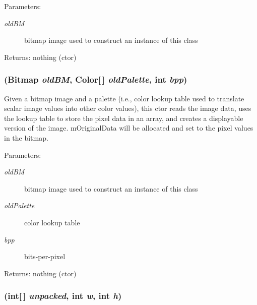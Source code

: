 \begin{Desc}
\item[Parameters:]
\begin{description}
\item[{\em old\-BM}]bitmap image used to construct an instance of this class \end{description}
\end{Desc}
\begin{Desc}
\item[Returns:]nothing (ctor) \end{Desc}
\subsubsection{ (Bitmap {\em old\-BM}, Color[$\,$] {\em old\-Palette}, int {\em bpp})}\label{class_c_s_image_viewer_1_1_color_image_data_0221e86bc6947ba666b133666ed7bac6}


Given a bitmap image and a palette (i.e., color lookup table used to translate scalar image values into other color values), this ctor reads the image data, uses the lookup table to store the pixel data in an array, and creates a displayable version of the image. m\-Original\-Data will be allocated and set to the pixel values in the bitmap. 

\begin{Desc}
\item[Parameters:]
\begin{description}
\item[{\em old\-BM}]bitmap image used to construct an instance of this class \item[{\em old\-Palette}]color lookup table \item[{\em bpp}]bits-per-pixel \end{description}
\end{Desc}
\begin{Desc}
\item[Returns:]nothing (ctor) \end{Desc}
\subsubsection{ (int[$\,$] {\em unpacked}, int {\em w}, int {\em h})}\label{class_c_s_image_viewer_1_1_color_image_data_db6cc52b98c9bef941ae3ae3d4fde96b}


